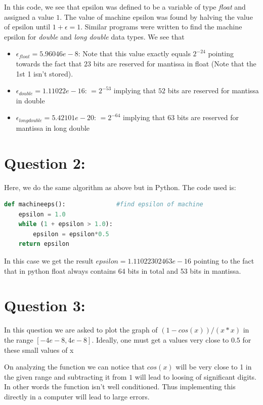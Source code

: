 \documentclass[11pt, a4paper]{article}
\begin{document}
In this code, we see that epsilon was defined to be a variable of type \emph{float} and assigned a value $1$. The value of machine 
epsilon was found by halving the value of epsilon until $1 + \epsilon = 1$. Similar programs were written to find the machine 
epsilon for \emph{double} and \emph{long double} data types. We see that
\begin{itemize}
 \item $\epsilon_{float} = 5.96046e-8$: Note that this value exactly equals $2^{-24}$ pointing towards the fact that $23$ bits are 
 reserved for mantissa in float (Note that the 1st 1 isn't stored). 
 \item $\epsilon_{double} = 1.11022e-16$: $= 2^{-53}$ implying that $52$ bits are reserved for mantissa in double
 \item $\epsilon_{longdouble} = 5.42101e-20$: $= 2^{-64}$ implying that $63$ bits are reserved for mantissa in long double
\end{itemize}

\section{Question 2:}
\label{Question2}
Here, we do the same algorithm as above but in Python. The code used is:
\begin{lstlisting}[language = Python, caption = Function to determine machine epsilon]
def machineeps():              #find epsilon of machine
	epsilon = 1.0 
	while (1 + epsilon > 1.0):
		epsilon = epsilon*0.5
	return epsilon

\end{lstlisting}

In this case we get the result $epsilon = 1.11022302463e-16$ pointing to the fact that in python float always contains 64 bits 
in total and 53 bits in mantissa.

\section{Question 3:}
\label{Question3}
In this question we are asked to plot the graph of $(1 - cos(x))/(x*x)$ in the range $[-4e-8, 4e-8]$. Ideally, one must get a 
values very close to $0.5$ for these small values of x

On analyzing the function
we can notice that $cos(x)$ will be very close to 1 in the given range and subtracting it from $1$ will lead to loosing of
significant digits. In other words the function isn't well conditioned. Thus implementing this directly in a computer will lead to large errors.
\end{document}
